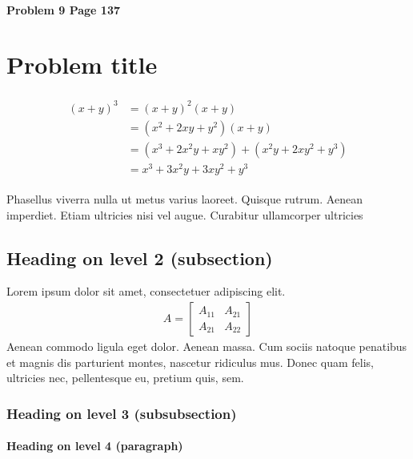 \documentclass[paper=a4, fontsize=11pt]{scrartcl} %
\numberwithin{equation}{section} %
\numberwithin{figure}{section} %
\numberwithin{table}{section} %
\begin{document}
\paragraph{Problem 9 Page 137}

\section{Problem title}

\lipsum[2] %

\begin{align}
\begin{split}
(x+y)^3 	&= (x+y)^2(x+y)\\
&=(x^2+2xy+y^2)(x+y)\\
&=(x^3+2x^2y+xy^2) + (x^2y+2xy^2+y^3)\\
&=x^3+3x^2y+3xy^2+y^3
\end{split}					
\end{align}

Phasellus viverra nulla ut metus varius laoreet. Quisque rutrum. Aenean imperdiet. Etiam ultricies nisi vel augue. Curabitur ullamcorper ultricies


\subsection{Heading on level 2 (subsection)}

Lorem ipsum dolor sit amet, consectetuer adipiscing elit.
\begin{align}
A =
\begin{bmatrix}
A_{11} & A_{21} \\
A_{21} & A_{22}
\end{bmatrix}
\end{align}
Aenean commodo ligula eget dolor. Aenean massa. Cum sociis natoque penatibus et magnis dis parturient montes, nascetur ridiculus mus. Donec quam felis, ultricies nec, pellentesque eu, pretium quis, sem.


\subsubsection{Heading on level 3 (subsubsection)}

\lipsum[3] %

\paragraph{Heading on level 4 (paragraph)}
\end{document}
